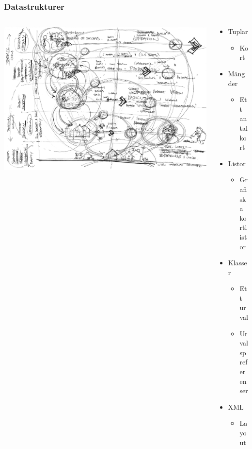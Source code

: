 \documentclass{beamer}
\begin{document}
\begin{frame}
    \frametitle{Datastrukturer}
    \begin{columns}
    \begin{column}{0.5\textwidth}
        \includegraphics[width=\textwidth]{mess.png}
    \end{column}
    \begin{column}{0.5\textwidth}
        \begin{itemize}
            \item Tuplar
            \begin{itemize}
                \item Kort
            \end{itemize}
            \item Mängder
            \begin{itemize}
                \item Ett antal kort
            \end{itemize}
            \item Listor
            \begin{itemize}
                \item Grafiska kortlistor
            \end{itemize}
            \item Klasser
            \begin{itemize}
                \item Ett urval
                \item Urvalspreferenser
            \end{itemize}
            \item XML
            \begin{itemize}
                \item Layout
            \end{itemize}
        \end{itemize}
    \end{column}
    \end{columns}
    
    
    
\end{frame}
\end{document}
